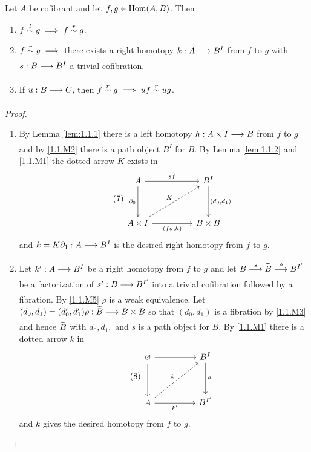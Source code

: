 \documentclass[../main]{subfiles}
\begin{document}
\begin{lemma}\label{lem:1.1.5}
	Let $A$ be cofibrant and let $f,g\in \operatorname{Hom}(A,B)$. Then
	\begin{enumerate}[label = (\roman*)]
		\item $f\overset{l}{\sim} g \implies f\overset{r}{\sim} g$.
		\item $f\overset{r}{\sim} g \implies$ there exists a right homotopy $k:A\varrightarrow{}B^I$ from $f$ to $g$ with $s:B\varrightarrow{}B^I$ a trivial cofibration.
		\item If $u:B\varrightarrow{}C$, then $f\overset{r}{\sim} g\implies uf\overset{r}{\sim} ug$.
	\end{enumerate}
\end{lemma}
\begin{proof}
	\begin{enumerate}[label = (\roman*)]
		\item By Lemma \ref{lem:1.1.1} there is a left homotopy $h:A\times I\varrightarrow{}B$ from $f$ to $g$ and by \ref{1.1.M2} there is a path object $B^I$ for $B$. By Lemma \ref{lem:1.1.2} and \ref{1.1.M1} the dotted arrow $K$ exists in
    \[\tag{7}\label{diag:1.1.7}\begin{tikzcd}
	A && {B^I} \\
	\\
	{A\times I} && {B\times B}
	\arrow["{\partial_0}"', from=1-1, to=3-1]
	\arrow["{(f\sigma,h)}"', from=3-1, to=3-3]
	\arrow["{(d_0,d_1)}", from=1-3, to=3-3]
	\arrow["sf", from=1-1, to=1-3]
	\arrow["K", dashed, from=3-1, to=1-3]
    \end{tikzcd}\]
		and $k=K\partial_1:A\varrightarrow{}B^I$ is the desired right homotopy from $f$ to $g$.

		\item Let $k':A\varrightarrow{} B^I$ be a right homotopy from $f$ to $g$ and let $B\varrightarrow{s} \xtilde{B}\varrightarrow{\rho} B^{I'}$ be a factorization of $s':B\varrightarrow{}B^{I'}$ into a trivial cofibration followed by a fibration. By \ref{1.1.M5} $\rho$ is a weak equivalence. Let \newline $(d_0,d_1)=(d_0',d_1')\rho:\xtilde{B} \varrightarrow{}B\times B$ so that $(d_0,d_1)$ is a fibration by \ref{1.1.M3} and hence $\xtilde{B}$ with $d_0,d_1,$ and $s$ is a path object for $B$. By \ref{1.1.M1} there is a dotted arrow $k$ in
    \[\tag{8}\label{diag:1.1.8}\begin{tikzcd}
	\varnothing && {B^I} \\
	\\
	A && {B^{I'}}
	\arrow[from=1-1, to=3-1]
	\arrow[from=1-1, to=1-3]
	\arrow["{k'}"', from=3-1, to=3-3]
	\arrow["\rho", from=1-3, to=3-3]
	\arrow["k", dashed, from=3-1, to=1-3]
    \end{tikzcd}\]
		and $k$ gives the desired homotopy from $f$ to $g$.


\end{enumerate}
\end{proof}
\end{document}

